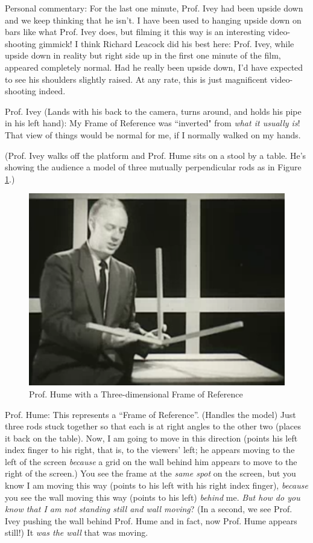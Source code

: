 \documentclass[a6paper]{article}
\begin{document}
Personal commentary: For the last one minute, Prof. Ivey had been upside down and we keep thinking that he isn't. I have been used to hanging upside down on bars like what Prof. Ivey does, but filming it this way is an interesting video-shooting gimmick! I think Richard Leacock did his best here: Prof. Ivey, while upside down in reality but right side up in the first one minute of the film, appeared completely normal. Had he really been upside down, I'd have expected to see his shoulders slightly raised. At any rate, this is just magnificent video-shooting indeed.

Prof. Ivey (Lands with his back to the camera, turns around, and holds his pipe in his left hand): My Frame of Reference was ``inverted" from \emph{what it usually is}! That view of things would be normal for me, if I normally walked on my hands.

(Prof. Ivey walks off the platform and Prof. Hume sits on a stool by a table. He's showing the audience a model of three mutually perpendicular rods as in Figure \ref{fig: a-3d-for}.)
        \begin{figure}[h!]
            \centering
            \includegraphics[width=0.5\linewidth]{prof-hume-with-an-example-frame-of-reference.png}
            \caption{Prof. Hume with a Three-dimensional Frame of Reference}
            \label{fig: a-3d-for}
        \end{figure}

Prof. Hume: This represents a ``Frame of Reference''. (Handles the model) Just three rods stuck together so that each is at right angles to the other two (places it back on the table). Now, I am going to move in this direction (points his left index finger to his right, that is, to the viewers' left; he appears moving to the left of the screen \emph{because} a grid on the wall behind him appears to move to the right of the screen.) You see the frame at the \emph{same spot} on the screen, but you know I am moving this way (points to his left with his right index finger), \emph{because} you see the wall moving this way (points to his left) \emph{behind} me. \emph{But how do you know that I am not standing still and wall moving}? (In a second, we see Prof. Ivey pushing the wall behind Prof. Hume and in fact, now Prof. Hume appears still!) It \emph{was the wall} that was moving.
\end{document}
